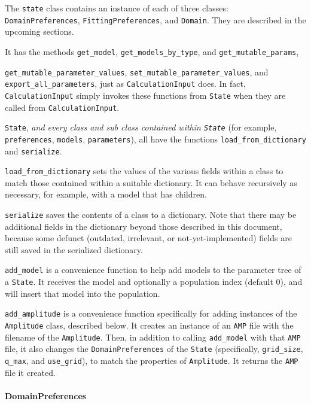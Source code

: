 \documentclass[../D+Manual.tex]{subfiles}
\begin{document}
The \texttt{state} class contains an instance of each of three classes:
\texttt{DomainPreferences}, \texttt{FittingPreferences}, and \texttt{Domain}. They are described in
the upcoming sections.

It has the methods \texttt{get\_model}, 
\texttt{get\_models\_by\_type},
and \texttt{get\_mutable\_params},
 
\texttt{get\_mutable\_parameter\_values},
\texttt{set\_mutable\_parameter\_values}, and \texttt{export\_all\_parameters}, just as \texttt{CalculationInput} does. In fact, \texttt{CalculationInput} simply
invokes these functions from \texttt{State} when they are called from
\texttt{CalculationInput}.

\texttt{State}, \emph{and every class and sub class contained within \texttt{State}} (for example, 
\texttt{preferences}, \texttt{models}, \texttt{parameters}), all have the functions
\texttt{load\_from\_dictionary} and \texttt{serialize}.

\texttt{load\_from\_dictionary} sets the values of the various fields within a class
to match those contained within a suitable dictionary. It can behave
recursively as necessary, for example, with a model that has children.

\texttt{serialize} saves the contents of a class to a dictionary. Note
that there may be additional fields in the dictionary beyond those
described in this document, because some defunct (outdated, irrelevant,
or not-yet-implemented) fields are still saved in the serialized
dictionary.

\texttt{add\_model} is a convenience function to help add models to the parameter tree of a \texttt{State}. It receives the model and optionally 
a population index (default 0), and will insert that model into the population.

\texttt{add\_amplitude} is a convenience function specifically for adding instances of the \texttt{Amplitude} class, described below. 
It creates an instance of an \texttt{AMP} file with the filename of the \texttt{Amplitude}. Then, in addition to calling \texttt{add\_model} with that \texttt{AMP} file, it also changes the \texttt{DomainPreferences} of the \texttt{State} (specifically, \texttt{grid\_size}, \texttt{q\_max}, and \texttt{use\_grid}), to match the properties of \texttt{Amplitude}.
It returns the \texttt{AMP} file it created.


\paragraph{DomainPreferences}\label{domainpreferences}
\end{document}
